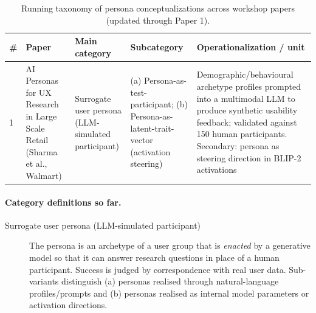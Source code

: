 
\begin{table}[t]
\centering
\caption{Running taxonomy of persona conceptualizations across workshop papers (updated through Paper 1).}
\label{tab:persona-taxonomy}
\small
\begin{tabular}{p{0.5cm} p{3.6cm} p{3.4cm} p{3.6cm} p{3.6cm}}
\toprule
\textbf{\#} & \textbf{Paper} & \textbf{Main category} & \textbf{Subcategory} & \textbf{Operationalization / unit} \\
\midrule
1 & AI Personas for UX Research in Large Scale Retail (Sharma et al., Walmart) &
Surrogate user persona (LLM-simulated participant) &
(a) Persona-as-test-participant; (b) Persona-as-latent-trait-vector (activation steering) &
Demographic/behavioural archetype profiles prompted into a multimodal LLM to produce synthetic usability feedback; validated against 150 human participants. Secondary: persona as steering direction in BLIP-2 activations \\
\bottomrule
\end{tabular}
\end{table}

\paragraph{Category definitions so far.}
\begin{description}
  \item[Surrogate user persona (LLM-simulated participant)] The persona is an
  archetype of a user group that is \emph{enacted} by a generative model so that
  it can answer research questions in place of a human participant. Success is
  judged by correspondence with real user data. Sub-variants distinguish
  (a) personas realised through natural-language profiles/prompts and
  (b) personas realised as internal model parameters or activation directions.
\end{description}
